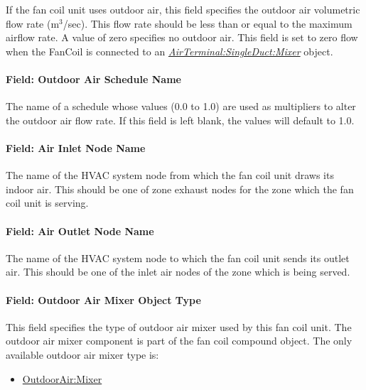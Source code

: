 If the fan coil unit uses outdoor air, this field specifies the outdoor air volumetric flow rate (m\(^{3}\)/sec). This flow rate should be less than or equal to the maximum airflow rate. A value of zero specifies no outdoor air. This field is set to zero flow when the FanCoil is connected to an \textit{\hyperref[airterminalsingleductmixer]{AirTerminal:SingleDuct:Mixer}} object.

\paragraph{Field: Outdoor Air Schedule Name}\label{field-outdoor-air-schedule-name-000}

The name of a schedule whose values (0.0 to 1.0) are used as multipliers to alter the outdoor air flow rate. If this field is left blank, the values will default to 1.0.

\paragraph{Field: Air Inlet Node Name}\label{field-air-inlet-node-name-009}

The name of the HVAC system node from which the fan coil unit draws its indoor air. This should be one of zone exhaust nodes for the zone which the fan coil unit is serving.

\paragraph{Field: Air Outlet Node Name}\label{field-air-outlet-node-name-008}

The name of the HVAC system node to which the fan coil unit sends its outlet air. This should be one of the inlet air nodes of the zone which is being served.

\paragraph{Field: Outdoor Air Mixer Object Type}\label{field-outdoor-air-mixer-object-type-000}

This field specifies the type of outdoor air mixer used by this fan coil unit. The outdoor air mixer component is part of the fan coil compound object. The only available outdoor air mixer type is:

\begin{itemize}
\tightlist
\item
  \hyperref[outdoorairmixer]{OutdoorAir:Mixer}
\end{itemize}

